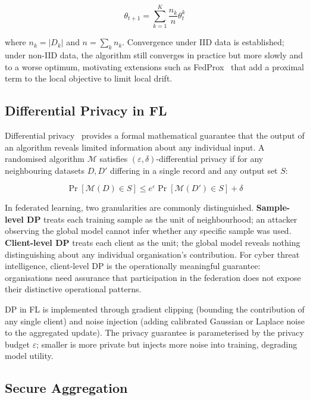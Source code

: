 \documentclass[sigconf,nonacm]{acmart}
\begin{document}
\begin{equation}
  \theta_{t+1} = \sum_{k=1}^{K} \frac{n_k}{n} \theta_t^{k}
\end{equation}

where $n_k = |D_k|$ and $n = \sum_k n_k$. Convergence under IID data is
established; under non-IID data, the algorithm still converges in
practice but more slowly and to a worse optimum, motivating extensions
such as FedProx~\cite{li2020fedprox} that add a proximal term to the local
objective to limit local drift.

\subsection{Differential Privacy in FL}

Differential privacy~\cite{dwork2014algorithmic} provides a formal
mathematical guarantee that the output of an algorithm reveals limited
information about any individual input. A randomised algorithm $\mathcal{M}$
satisfies $(\varepsilon, \delta)$-differential privacy if for any neighbouring
datasets $D, D'$ differing in a single record and any output set $S$:

\begin{equation}
  \Pr[\mathcal{M}(D) \in S] \leq e^{\varepsilon} \Pr[\mathcal{M}(D') \in S] + \delta
\end{equation}

In federated learning, two granularities are commonly distinguished.
\textbf{Sample-level DP} treats each training sample as the unit of
neighbourhood; an attacker observing the global model cannot infer whether
any specific sample was used. \textbf{Client-level DP} treats each client
as the unit; the global model reveals nothing distinguishing about any
individual organisation's contribution. For cyber threat intelligence,
client-level DP is the operationally meaningful guarantee: organisations
need assurance that participation in the federation does not expose their
distinctive operational patterns.

DP in FL is implemented through gradient clipping (bounding the
contribution of any single client) and noise injection (adding calibrated
Gaussian or Laplace noise to the aggregated update). The privacy guarantee
is parameterised by the privacy budget $\varepsilon$; smaller is more
private but injects more noise into training, degrading model utility.

\subsection{Secure Aggregation}
\end{document}
